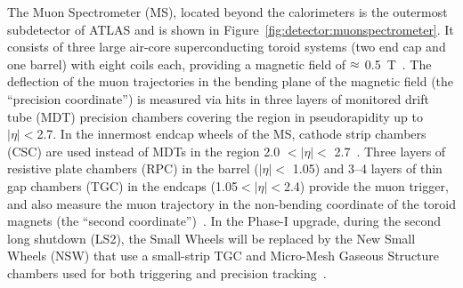 The Muon Spectrometer (MS), located beyond the calorimeters is the outermost subdetector of ATLAS and is shown in Figure~\ref{fig:detector:muonspectrometer}.
It consists of three large air-core superconducting toroid systems (two end cap and one barrel) with eight coils each, providing a magnetic field of $\small\approx$ 0.5~T~\cite{ATLAS:2010xrj}.
The deflection of the muon trajectories in the bending plane of the magnetic field (the ``precision coordinate'') is measured via hits in three layers of monitored drift tube (MDT) precision chambers covering the region in pseudorapidity up to $|\eta|<$2.7.
In the innermost endcap wheels of the MS, cathode strip chambers (CSC) are used instead of MDTs in the region 2.0 $<|\eta|<$ 2.7~\cite{ATLAS:2010xrj}.
Three layers of resistive plate chambers (RPC) in the barrel ($|\eta|<$ 1.05) and 3–4 layers of thin gap chambers (TGC) in the endcaps (1.05$<|\eta|<$2.4) provide the muon trigger, and also measure the muon trajectory in the non-bending coordinate of the toroid magnets (the ``second coordinate'')~\cite{ATLAS:2010xrj}.
In the Phase-I upgrade, during the second long shutdown (LS2), the Small Wheels will be replaced by the New Small Wheels (NSW) that use a small-strip TGC and Micro-Mesh Gaseous Structure chambers used for both triggering and precision tracking~\cite{ATLAS:2010xrj}.
